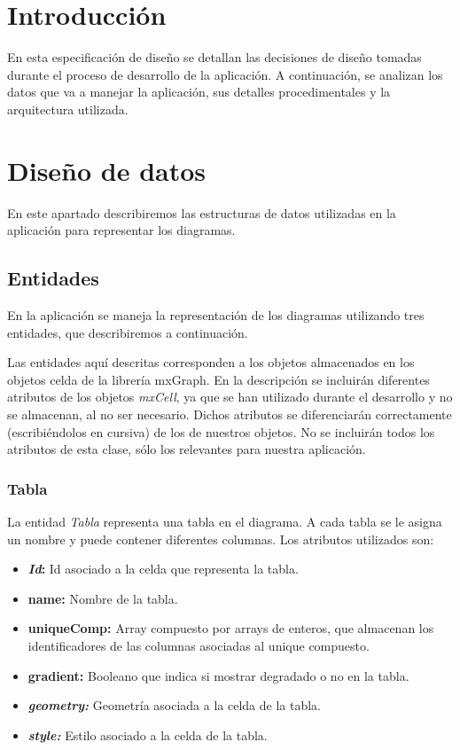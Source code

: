 
\section{Introducción}

En esta especificación de diseño se detallan las decisiones de diseño tomadas durante el proceso de desarrollo de la aplicación. A continuación, se analizan los datos que va a manejar la aplicación, sus detalles procedimentales y la arquitectura utilizada.

\section{Diseño de datos}

En este apartado describiremos las estructuras de datos utilizadas en la aplicación para representar los diagramas.

\subsection{Entidades}

En la aplicación se maneja la representación de los diagramas utilizando tres entidades, que describiremos a continuación.

Las entidades aquí descritas corresponden a los objetos almacenados en los objetos celda de la librería mxGraph. En la descripción se incluirán diferentes atributos de los objetos \emph{mxCell}, ya que se han utilizado durante el desarrollo y no se almacenan, al no ser necesario. Dichos atributos se diferenciarán correctamente (escribiéndolos en cursiva) de los de nuestros objetos. No se incluirán todos los atributos de esta clase, sólo los relevantes para nuestra aplicación.

\subsubsection{Tabla}

La entidad \emph{Tabla} representa una tabla en el diagrama. A cada tabla se le asigna un nombre y puede contener diferentes columnas. Los atributos utilizados son:
\begin{itemize}
    \item \textbf{\textit{Id}: }Id asociado a la celda que representa la tabla.
    \item \textbf{name: }Nombre de la tabla.
    \item \textbf{uniqueComp: }Array compuesto por arrays de enteros, que almacenan los identificadores de las columnas asociadas al unique compuesto.
    \item \textbf{gradient: }Booleano que indica si mostrar degradado o no en la tabla.
    \item \textbf{\textit{geometry: }}Geometría asociada a la celda de la tabla.
    \item \textbf{\textit{style: }}Estilo asociado a la celda de la tabla.
\end{itemize}

